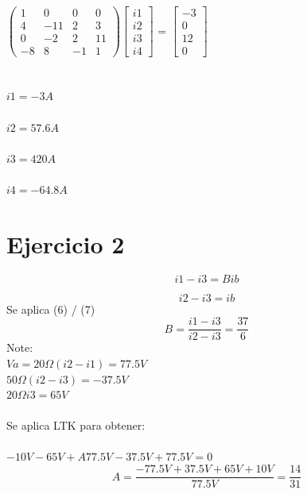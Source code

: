 \documentclass{article}
\begin{document}
$
\begin{pmatrix}
    1 & 0 & 0 & 0 \\
    4 & -11 & 2 & 3 \\
    0 & -2 & 2 & 11\\
    -8 & 8 & -1 & 1
\end{pmatrix}
$$\begin{bmatrix}
    i1 \\
    i2 \\
    i3 \\
    i4 
\end{bmatrix}
$ = $\begin{bmatrix}
    -3 \\
    0 \\
    12  \\
    0
\end{bmatrix}
$ \\ \\ \\
$i1 = -3A$ \\ \\
$i2 = 57.6A$ \\ \\
$i3 = 420A$ \\ \\
$i4 = -64.8A$\\
\section{Ejercicio 2}

\begin{equation}
    i1 - i3 = Bib
\end{equation}

\begin{equation}
    i2 - i3 = ib
\end{equation}
Se aplica (6) / (7)\\ 
\begin{equation}
    B = \frac{i1-i3}{i2 -i3} = \frac{37}{6}
\end{equation}
Note: \\
$Va={20\Omega}(i2 - i1) = 77.5V$ \\ 
${50\Omega}(i2 - i3) = -37.5V$\\ 
${20\Omega}i3 = 65V$\\  \\
Se aplica LTK para obtener:\\ \\
$ -10V - 65V + A77.5V -37.5V+ 77.5V = 0$
\begin{equation}
    A = \frac{-77.5V + 37.5V +65V + 10V}{77.5V} = \frac{14}{31}
\end{equation}
\end{document}
